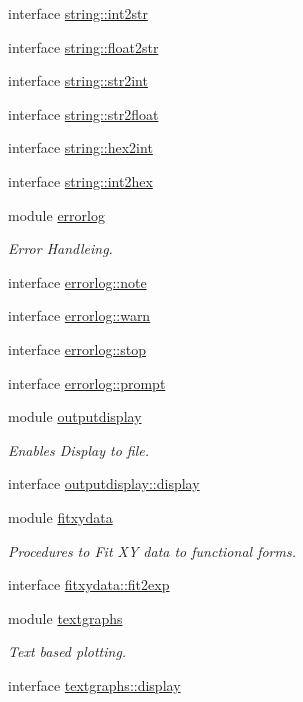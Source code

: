 \begin{DoxyCompactItemize}
interface \hyperlink{interfacestring_1_1int2str}{string\+::int2str}
\item 
interface \hyperlink{interfacestring_1_1float2str}{string\+::float2str}
\item 
interface \hyperlink{interfacestring_1_1str2int}{string\+::str2int}
\item 
interface \hyperlink{interfacestring_1_1str2float}{string\+::str2float}
\item 
interface \hyperlink{interfacestring_1_1hex2int}{string\+::hex2int}
\item 
interface \hyperlink{interfacestring_1_1int2hex}{string\+::int2hex}
\item 
module \hyperlink{classerrorlog}{errorlog}
\begin{DoxyCompactList}\small\item\em Error Handleing. \end{DoxyCompactList}\item 
interface \hyperlink{interfaceerrorlog_1_1note}{errorlog\+::note}
\item 
interface \hyperlink{interfaceerrorlog_1_1warn}{errorlog\+::warn}
\item 
interface \hyperlink{interfaceerrorlog_1_1stop}{errorlog\+::stop}
\item 
interface \hyperlink{interfaceerrorlog_1_1prompt}{errorlog\+::prompt}
\item 
module \hyperlink{classoutputdisplay}{outputdisplay}
\begin{DoxyCompactList}\small\item\em Enables Display to file. \end{DoxyCompactList}\item 
interface \hyperlink{interfaceoutputdisplay_1_1display}{outputdisplay\+::display}
\item 
module \hyperlink{classfitxydata}{fitxydata}
\begin{DoxyCompactList}\small\item\em Procedures to Fit X\+Y data to functional forms. \end{DoxyCompactList}\item 
interface \hyperlink{interfacefitxydata_1_1fit2exp}{fitxydata\+::fit2exp}
\item 
module \hyperlink{classtextgraphs}{textgraphs}
\begin{DoxyCompactList}\small\item\em Text based plotting. \end{DoxyCompactList}\item 
interface \hyperlink{interfacetextgraphs_1_1display}{textgraphs\+::display}
\end{DoxyCompactItemize}
